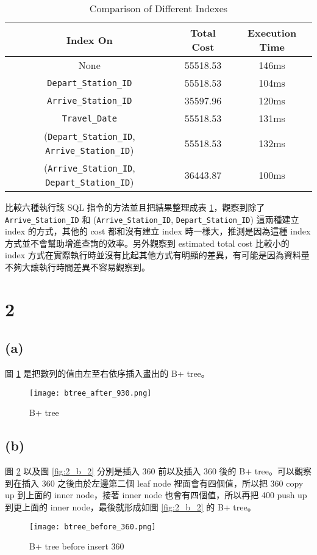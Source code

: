\documentclass{article}
\begin{document}
\begin{table}[H]
    \centering
    \begin{tabular}{ccc}
        \toprule
        \textbf{Index On} & \textbf{Total Cost} & \textbf{Execution Time} \\
        \midrule
        None & 55518.53 & 146ms\\
        \texttt{Depart\_Station\_ID} & 55518.53 & 104ms \\
        \texttt{Arrive\_Station\_ID} & 35597.96 & 120ms \\
        \texttt{Travel\_Date} & 55518.53 & 131ms\\
        (\texttt{Depart\_Station\_ID}, \texttt{Arrive\_Station\_ID}) & 55518.53 & 132ms \\
        (\texttt{Arrive\_Station\_ID}, \texttt{Depart\_Station\_ID}) & 36443.87 & 100ms \\
        \bottomrule
    \end{tabular}
    \caption{Comparison of Different Indexes}
    \label{tab:1_6_index-comparison}
\end{table}
比較六種執行該 SQL 指令的方法並且把結果整理成表 \ref{tab:1_6_index-comparison}，觀察到除了 \texttt{Arrive\_Station\_ID} 和 (\texttt{Arrive\_Station\_ID}, \texttt{Depart\_Station\_ID}) 這兩種建立 index 的方式，其他的 cost 都和沒有建立 index 時一樣大，推測是因為這種 index 方式並不會幫助增進查詢的效率。另外觀察到 estimated total cost 比較小的 index 方式在實際執行時並沒有比起其他方式有明顯的差異，有可能是因為資料量不夠大讓執行時間差異不容易觀察到。




\section*{2}
\subsection*{(a)}
圖 \ref{fig:2_a} 是把數列的值由左至右依序插入畫出的 B+ tree。
\begin{figure}[H]
    \centering
    \texttt{[image: btree\_after\_930.png]}
    \caption{B+ tree}
    \label{fig:2_a}
\end{figure}

\subsection*{(b)}
圖 \ref{fig:2_b_1} 以及圖 \ref{fig:2_b_2} 分別是插入 360 前以及插入 360 後的 B+ tree。可以觀察到在插入 360 之後由於左邊第二個 leaf node 裡面會有四個值，所以把 360 copy up 到上面的 inner node，接著 inner node 也會有四個值，所以再把 400 push up 到更上面的 inner node，最後就形成如圖 \ref{fig:2_b_2} 的 B+ tree。
\begin{figure}[H]
    \centering
    \texttt{[image: btree\_before\_360.png]}
    \caption{B+ tree before insert 360}
    \label{fig:2_b_1}
\end{figure}
\end{document}
